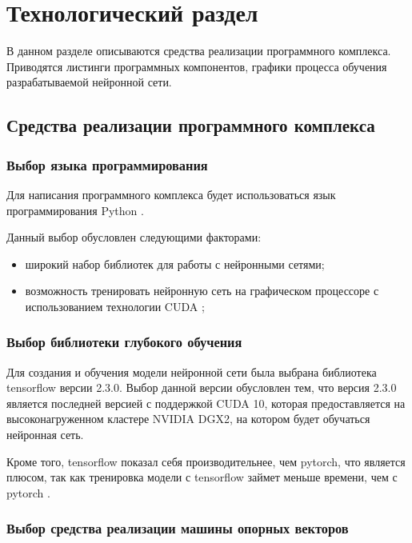 \section{Технологический раздел}

В данном разделе описываются средства реализации программного комплекса. Приводятся листинги программных компонентов, графики процесса обучения разрабатываемой нейронной сети.

\subsection{Средства реализации программного комплекса}

\subsubsection{Выбор языка программирования}

Для написания программного комплекса будет использоваться язык программирования Python \cite{python}.

Данный выбор обусловлен следующими факторами:
\begin{itemize}
	\item широкий набор библиотек для работы с нейронными сетями;
	\item возможность тренировать нейронную сеть на графическом процессоре с использованием технологии CUDA \cite{cuda};
\end{itemize}

\subsubsection{Выбор библиотеки глубокого обучения}

Для создания и обучения модели нейронной сети была выбрана библиотека tensorflow \cite{tensorflow} версии 2.3.0. Выбор данной версии обусловлен тем, что версия 2.3.0 является последней версией с поддержкой CUDA 10, которая предоставляется на высоконагруженном кластере NVIDIA DGX2, на котором будет обучаться нейронная сеть.

Кроме того, tensorflow показал себя производительнее, чем pytorch, что является плюсом, так как тренировка модели с tensorflow займет меньше времени, чем с pytorch \cite{ptvstf}.

\subsubsection{Выбор средства реализации машины опорных векторов}

